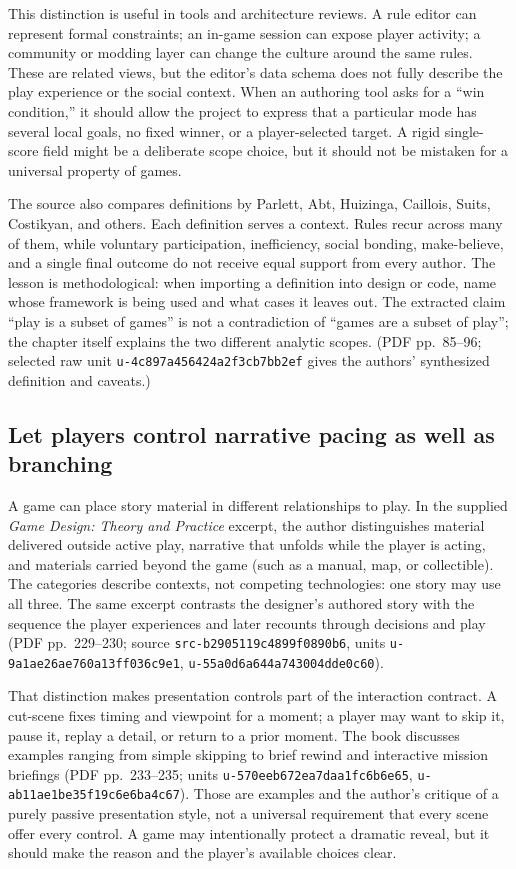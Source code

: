 This distinction is useful in tools and architecture reviews. A rule editor can represent formal constraints; an in-game session can expose player activity; a community or modding layer can change the culture around the same rules. These are related views, but the editor's data schema does not fully describe the play experience or the social context. When an authoring tool asks for a ``win condition,'' it should allow the project to express that a particular mode has several local goals, no fixed winner, or a player-selected target. A rigid single-score field might be a deliberate scope choice, but it should not be mistaken for a universal property of games.

The source also compares definitions by Parlett, Abt, Huizinga, Caillois, Suits, Costikyan, and others. Each definition serves a context. Rules recur across many of them, while voluntary participation, inefficiency, social bonding, make-believe, and a single final outcome do not receive equal support from every author. The lesson is methodological: when importing a definition into design or code, name whose framework is being used and what cases it leaves out. The extracted claim ``play is a subset of games'' is not a contradiction of ``games are a subset of play''; the chapter itself explains the two different analytic scopes. (PDF pp.~85--96; selected raw unit \texttt{u-4c897a456424a2f3cb7bb2ef} gives the authors' synthesized definition and caveats.)

\subsection{Let players control narrative pacing as well as branching}\label{let-players-control-narrative-pacing-as-well-as-branching}

A game can place story material in different relationships to play. In the supplied \emph{Game Design: Theory and Practice} excerpt, the author distinguishes material delivered outside active play, narrative that unfolds while the player is acting, and materials carried beyond the game (such as a manual, map, or collectible). The categories describe contexts, not competing technologies: one story may use all three. The same excerpt contrasts the designer's authored story with the sequence the player experiences and later recounts through decisions and play (PDF pp.~229--230; source \texttt{src-b2905119c4899f0890b6}, units \texttt{u-9a1ae26ae760a13ff036c9e1}, \texttt{u-55a0d6a644a743004dde0c60}).

That distinction makes presentation controls part of the interaction contract. A cut-scene fixes timing and viewpoint for a moment; a player may want to skip it, pause it, replay a detail, or return to a prior moment. The book discusses examples ranging from simple skipping to brief rewind and interactive mission briefings (PDF pp.~233--235; units \texttt{u-570eeb672ea7daa1fc6b6e65}, \texttt{u-ab11ae1be35f19c6e6ba4c67}). Those are examples and the author's critique of a purely passive presentation style, not a universal requirement that every scene offer every control. A game may intentionally protect a dramatic reveal, but it should make the reason and the player's available choices clear.


